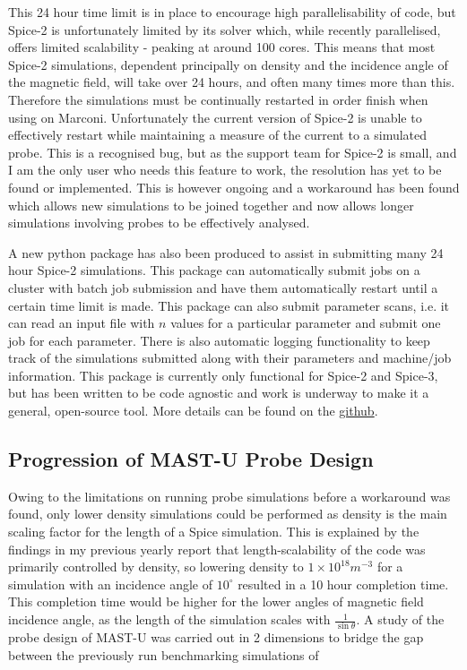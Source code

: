 \documentclass[a4paper, 12pt]{article} %
\begin{document}
    This 24 hour time limit is in place to encourage high parallelisability of code, but Spice-2 is unfortunately limited by its solver which, while recently parallelised, offers limited scalability - peaking at around 100 cores.
    This means that most Spice-2 simulations, dependent principally on density and the incidence angle of the magnetic field, will take over 24 hours, and often many times more than this. 
    Therefore the simulations must be continually restarted in order finish when using on Marconi. 
    Unfortunately the current version of Spice-2 is unable to effectively restart while maintaining a measure of the current to a simulated probe. 
    This is a recognised bug, but as the support team for Spice-2 is small, and I am the only user who needs this feature to work, the resolution has yet to be found or implemented.
    This is however ongoing and a workaround has been found which allows new simulations to be joined together and now allows longer simulations involving probes to be effectively analysed. 
    
    A new python package has also been produced to assist in submitting many 24 hour Spice-2 simulations.
    This package can automatically submit jobs on a cluster with batch job submission and have them automatically restart until a certain time limit is made. 
    This package can also submit parameter scans, i.e. it can read an input file with $n$ values for a particular parameter and submit one job for each parameter. 
    There is also automatic logging functionality to keep track of the simulations submitted along with their parameters and machine/job information. 
    This package is currently only functional for Spice-2 and Spice-3, but has been written to be code agnostic and work is underway to make it a general, open-source tool. 
    More details can be found on the \hyperlink{https://github.com/jackleland/autospice/tree/development}{github}.
	
\subsection{\label{subsec:mastu_probe_design} Progression of MAST-U Probe Design}
	Owing to the limitations on running probe simulations before a workaround was found, only lower density simulations could be performed as density is the main scaling factor for the length of a Spice simulation.
	This is explained by the findings in my previous yearly report that length-scalability of the code was primarily controlled by density, so lowering density to $1 \times 10^{18} m^{-3}$ for a simulation with an incidence angle of $10^{\circ}$ resulted in a 10 hour completion time. 
	This completion time would be higher for the lower angles of magnetic field incidence angle, as the length of the simulation scales with $\frac{1}{\sin{\theta}}$. 
	A study of the probe design of MAST-U was carried out in 2 dimensions to bridge the gap between the previously run benchmarking simulations of 
\end{document}
